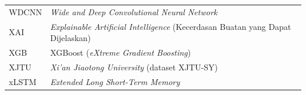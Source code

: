\begin{singlespace}
\begin{longtable}{@{}p{2.6cm}p{\dimexpr\textwidth-2.6cm-2\tabcolsep\relax}@{}}
WDCNN       & \emph{Wide and Deep Convolutional Neural Network} \\
XAI         & \emph{Explainable Artificial Intelligence} (Kecerdasan Buatan yang Dapat Dijelaskan) \\
XGB         & XGBoost (\emph{eXtreme Gradient Boosting}) \\
XJTU        & \emph{Xi'an Jiaotong University} (dataset XJTU-SY) \\
xLSTM       & \emph{Extended Long Short-Term Memory} \\
\end{longtable}
\end{singlespace}
